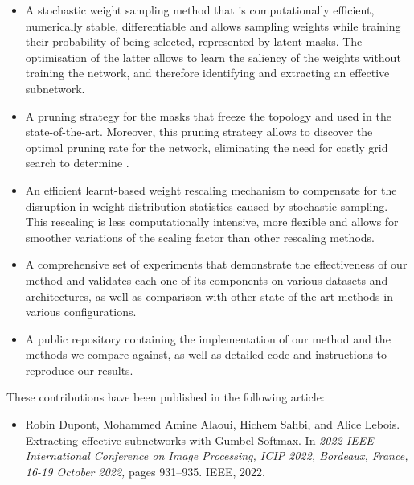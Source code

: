 \begin{itemize}
      \item A stochastic weight sampling method that is computationally
            efficient, numerically stable, differentiable and allows sampling
            weights while training their probability of being selected,
            represented by latent masks. The optimisation of the latter allows
            to learn the saliency of the weights without training the network,
            and therefore identifying and extracting an effective subnetwork.

      \item A pruning strategy for the masks that freeze the topology and
            \DIFdelbegin {}\DIFdelend \DIFaddbegin {}\DIFaddend used in the
            state-of-the-art. Moreover, this pruning strategy allows to discover
            the optimal pruning rate for the network, eliminating the need for
            costly grid search to determine \DIFdelbegin {}\DIFdelend \DIFaddbegin {}\DIFaddend .

      \item An efficient learnt-based weight rescaling mechanism to compensate
            for the disruption in weight distribution statistics caused by
            stochastic sampling. This \DIFdelbegin {}\DIFdelend rescaling is less computationally
            intensive, more flexible and allows for smoother variations of the
            scaling factor than other rescaling methods.

      \item A comprehensive set of experiments that demonstrate the
            effectiveness of our method and validates each one of its components
            on various datasets and architectures, as well as comparison with
            other \DIFaddbegin {}\DIFaddend state-of-the-art methods in various
            configurations.

      \item A public repository containing the implementation of our method and
            the methods we compare against, as well as detailed code and instructions to
            reproduce our results.\\
\end{itemize}

\noindent These contributions have been published in the following article:
\begin{itemize}
      \item Robin Dupont, Mohammed Amine Alaoui, Hichem Sahbi, and Alice
            Lebois. Extracting effective subnetworks with Gumbel-Softmax. In \textit{2022
                  IEEE International Conference on Image Processing, ICIP 2022, Bordeaux,
                  France, 16-19 October 2022,} pages 931–935. IEEE, 2022.\\
\end{itemize}

